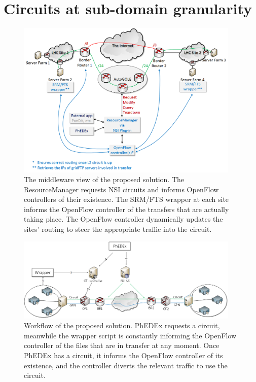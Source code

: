 \section{Circuits at sub-domain granularity}

\begin{figure}[h]
  \centering
  \includegraphics[width=0.95\textwidth]{figure-proposed-solution-global}
  \caption{The middleware view of the proposed solution. The ResourceManager requests NSI circuits and informs OpenFlow controllers of their existence. The SRM/FTS wrapper at each site informs the OpenFlow controller of the transfers that are actually taking place. The OpenFlow controller dynamically updates the sites' routing to steer the appropriate traffic into the circuit.}
  \label{fig:proposed-solution-global}
\end{figure}

\begin{figure}[h]
  \centering
  \includegraphics[width=0.95\textwidth]{figure-proposed-solution-detail}
  \caption{Workflow of the proposed solution. PhEDEx requests a circuit, meanwhile the wrapper script is constantly informing the OpenFlow controller of the files that are in transfer at any moment. Once PhEDEx has a circuit, it informs the OpenFlow controller of its existence, and the controller diverts the relevant traffic to use the circuit.}
  \label{fig:proposed-solution-detail}
\end{figure}

